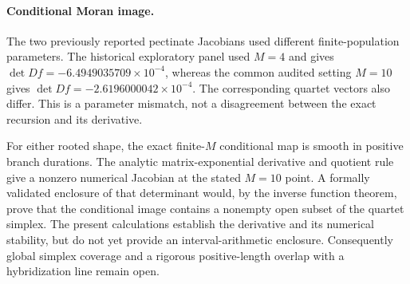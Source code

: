 \paragraph{Conditional Moran image.}
The two previously reported pectinate Jacobians used different finite-population
parameters. The historical exploratory panel used $M=4$ and gives
$\det Df=-6.4949035709\times10^{-4}$, whereas the common audited setting
$M=10$ gives $\det Df=-2.6196000042\times10^{-4}$. The corresponding quartet
vectors also differ. This is a parameter mismatch, not a disagreement between
the exact recursion and its derivative.

For either rooted shape, the exact finite-$M$ conditional map is smooth in
positive branch durations. The analytic matrix-exponential derivative and
quotient rule give a nonzero numerical Jacobian at the stated $M=10$ point.
A formally validated enclosure of that determinant would, by the inverse
function theorem, prove that the conditional image contains a nonempty open
subset of the quartet simplex. The present calculations establish the
derivative and its numerical stability, but do not yet provide an
interval-arithmetic enclosure. Consequently global simplex coverage and a
rigorous positive-length overlap with a hybridization line remain open.
